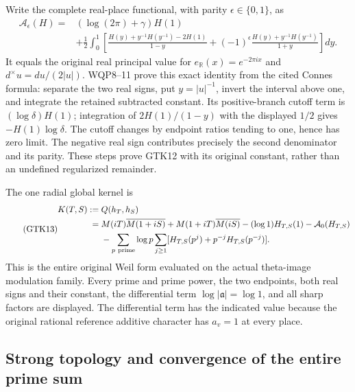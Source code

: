 Write the complete real-place functional, with parity
$\epsilon\in\{0,1\}$, as
\begin{equation}\tag{GTK12}
 \begin{split}
 \mathcal A_\epsilon(H)={}&(\log(2\pi)+\gamma)H(1)\\
 &+\frac12\int_0^1\left[
 \frac{H(y)+y^{-1}H(y^{-1})-2H(1)}{1-y}
 +(-1)^\epsilon\frac{H(y)+y^{-1}H(y^{-1})}{1+y}
 \right]dy .
 \end{split}
\end{equation}
It equals the original real principal value for
$e_{\mathbb R}(x)=e^{-2\pi ix}$ and
$d^\times u=du/(2|u|)$. WQP8--11 prove this exact identity
from the cited Connes formula: separate the two real signs,
put $y=|u|^{-1}$, invert the interval above one, and integrate
the retained subtracted constant. Its positive-branch cutoff
term is $(\log\delta)H(1)$; integration of $2H(1)/(1-y)$
with the displayed $1/2$ gives $-H(1)\log\delta$.
The cutoff changes by endpoint ratios tending to one, hence
has zero limit. The negative real sign contributes precisely
the second denominator and its parity. These steps prove
GTK12 with its original constant, rather than an undefined
regularized remainder.

The one radial global kernel is
\begin{equation}\tag{GTK13}
 \begin{split}
 K(T,S):={}&Q(h_T,h_S)\\
 ={}&M(iT)\overline{M(1+iS)}
       +M(1+iT)\overline{M(iS)}
       -(\log1)H_{T,S}(1)-\mathcal A_0(H_{T,S})\\
 &-\sum_{p\ {\rm prime}}\log p\sum_{j\ge1}
       [H_{T,S}(p^j)+p^{-j}H_{T,S}(p^{-j})].
 \end{split}
\end{equation}
This is the entire original Weil form evaluated on the actual
theta-image modulation family. Every prime and prime power,
the two endpoints, both real signs and their constant, the
differential term $\log|\mathfrak a|=\log1$, and all sharp
factors are displayed. The differential term has the indicated
value because the original rational reference additive character
has $a_v=1$ at every place.

\subsection{Strong topology and convergence of the entire prime sum}

